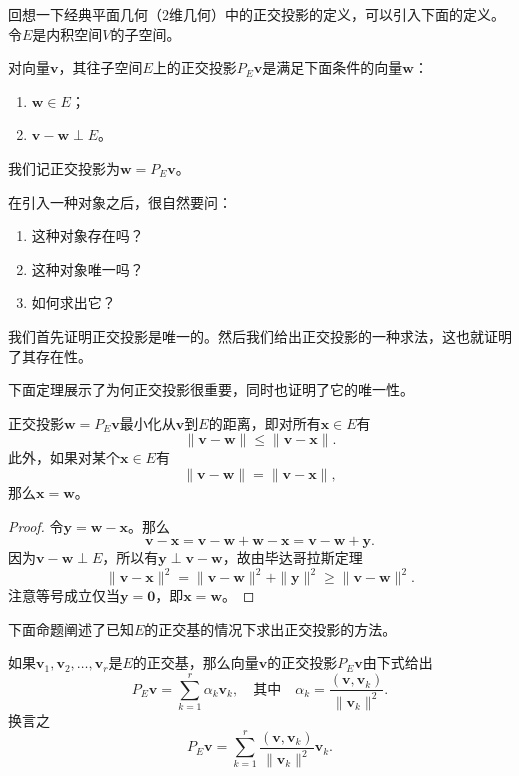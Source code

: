 回想一下经典平面几何（$2$维几何）中的正交投影的定义，可以引入下面的定义。令$E$是内积空间$V$的子空间。

\begin{definition}
    对向量$\mathbf{v}$，其往子空间$E$上的正交投影$P_E\mathbf{v}$是满足下面条件的向量$\mathbf{w}$：
    \begin{enumerate}
        \item $\mathbf{w}\in E$；
        \item $\mathbf{v}-\mathbf{w}\perp E$。
    \end{enumerate}
    我们记正交投影为$\mathbf{w}=P_E\mathbf{v}$。
\end{definition}

在引入一种对象之后，很自然要问：
\begin{enumerate}
    \item 这种对象存在吗？
    \item 这种对象唯一吗？
    \item 如何求出它？
\end{enumerate}

我们首先证明正交投影是唯一的。然后我们给出正交投影的一种求法，这也就证明了其存在性。

下面定理展示了为何正交投影很重要，同时也证明了它的唯一性。

\begin{theorem}
    正交投影$\mathbf{w}=P_E\mathbf{v}$最小化从$\mathbf{v}$到$E$的距离，即对所有$\mathbf{x}\in E$有\[\|\mathbf{v}-\mathbf{w}\|\leq\|\mathbf{v}-\mathbf{x}\|.\]
    此外，如果对某个$\mathbf{x}\in E$有\[\|\mathbf{v}-\mathbf{w}\|=\|\mathbf{v}-\mathbf{x}\|,\]
    那么$\mathbf{x}=\mathbf{w}$。
\end{theorem}

\begin{proof}
    令$\mathbf{y}=\mathbf{w}-\mathbf{x}$。那么\[\mathbf{v}-\mathbf{x}=\mathbf{v}-\mathbf{w}+\mathbf{w}-\mathbf{x}=\mathbf{v}-\mathbf{w}+\mathbf{y}.\]
    因为$\mathbf{v}-\mathbf{w}\perp E$，所以有$\mathbf{y}\perp \mathbf{v}-\mathbf{w}$，故由毕达哥拉斯定理
    \[\|\mathbf{v}-\mathbf{x}\|^2=\|\mathbf{v}-\mathbf{w}\|^2+\|\mathbf{y}\|^2\geq\|\mathbf{v}-\mathbf{w}\|^2.\]
    注意等号成立仅当$\mathbf{y}=\mathbf{0}$，即$\mathbf{x}=\mathbf{w}$。
\end{proof}

下面命题阐述了已知$E$的正交基的情况下求出正交投影的方法。

\begin{proposition}\label{prop:projection_solution}
    如果$\mathbf{v}_{1},\mathbf{v}_{2},\ldots,\mathbf{v}_{r}$是$E$的正交基，那么向量$\mathbf{v}$的正交投影$P_E\mathbf{v}$由下式给出
    \[P_E\mathbf{v}=\sum_{k=1}^r\alpha_k\mathbf{v}_k,\quad \text{其中}\quad\alpha_k=\frac{(\mathbf{v},\mathbf{v}_k)}{\|\mathbf{v}_k\|^2}.\]
    换言之
    \begin{equation}\label{projection_eq}
        P_E\mathbf{v}=\sum_{k=1}^r\frac{(\mathbf{v},\mathbf{v}_k)}{\|\mathbf{v}_k\|^2}\mathbf{v}_k.
    \end{equation}
\end{proposition}


